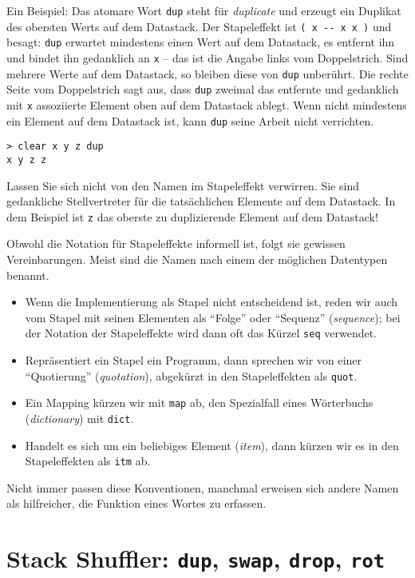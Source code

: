 Ein Beispiel: Das atomare Wort \verb|dup| steht für \emph{duplicate} und erzeugt ein Duplikat des obersten Werts auf dem Datastack. Der Stapeleffekt ist \verb|( x -- x x )| und besagt: \verb|dup| erwartet mindestens einen Wert auf dem Datastack, es entfernt ihn und bindet ihn gedanklich an \verb|x| -- das ist die Angabe links vom Doppelstrich. Sind mehrere Werte auf dem Datastack, so bleiben diese von \verb|dup| unberührt. Die rechte Seite vom Doppelstrich sagt aus, dass \verb|dup| zweimal das entfernte und gedanklich mit \verb|x| assoziierte Element oben auf dem Datastack ablegt. Wenn nicht mindestens ein Element auf dem Datastack ist, kann \verb|dup| seine Arbeit nicht verrichten.

\begin{verbatim}
> clear x y z dup
x y z z
\end{verbatim}

Lassen Sie sich nicht von den Namen im Stapeleffekt verwirren. Sie sind gedankliche Stellvertreter für die tatsächlichen Elemente auf dem Datastack. In dem Beispiel ist \verb|z| das oberste zu duplizierende Element auf dem Datastack!

Obwohl die Notation für Stapeleffekte informell ist, folgt sie gewissen Vereinbarungen. Meist sind die Namen nach einem der möglichen Datentypen benannt.

\begin{itemize}
\item Wenn die Implementierung als Stapel nicht entscheidend ist, reden wir auch vom Stapel mit seinen Elementen als "`Folge"' oder "`Sequenz"' (\emph{sequence}); bei der Notation der Stapeleffekte wird dann oft das Kürzel \verb|seq| verwendet.
\item Repräsentiert ein Stapel ein Programm, dann sprechen wir von einer "`Quotierung"' (\emph{quotation}), abgekürzt in den Stapeleffekten als \verb|quot|.
\item Ein Mapping kürzen wir mit \verb|map| ab, den Spezialfall eines Wör\-ter\-buchs (\emph{dictionary}) mit \verb|dict|. 
\item Handelt es sich um ein beliebiges Element (\emph{item}), dann kürzen wir es in den Stapeleffekten als \verb|itm| ab.
\end{itemize}

Nicht immer passen diese Konventionen, manchmal erweisen sich andere Namen als hilfreicher, die Funktion eines Wortes zu erfassen.

\section{Stack Shuffler: \texttt{dup}, \texttt{swap}, \texttt{drop}, \texttt{rot}}


